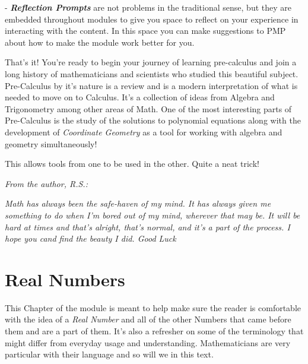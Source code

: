 \documentclass{amsart}
\numberwithin{equation}{section}
\theoremstyle{plain} %
\theoremstyle{definition}
\theoremstyle{remark}
\begin{document}
- \textbf{\textit{Reflection Prompts}} are not problems in the traditional sense, but they are embedded throughout modules to give you space to reflect 
on your experience in interacting with the content. In this space you can make suggestions to PMP about how to make the module work better for you.


\vspace{0.3cm}

That's it! You're ready to begin your journey of learning pre-calculus and join a long history of mathematicians and scientists who studied this beautiful subject. %
Pre-Calculus by it's nature is a review and is a modern interpretation of what is needed to move on to Calculus. It's a collection of ideas from Algebra and Trigonometry among other areas of Math. One of the most
interesting parts of Pre-Calculus is the study of the solutions to polynomial equations along with the development of \emph{Coordinate Geometry} as a tool for working with algebra and geometry simultaneously!

This allows tools from one to be used in the other. Quite a neat trick!%

\newpage


\textit{From the author, R.S.:}%

\textit{\small Math has always been the safe-haven of my mind. It has always given me something to do when I'm bored out of my mind, wherever that may be. It will be hard at times and that's alright, that's normal, and it's a part of the process. I hope you cand find the beauty I did. Good Luck} %




\newpage


\tableofcontents





\newpage

\section{\textbf{Real Numbers}}
This Chapter of the module is meant to help make sure the reader is comfortable with the idea of a \emph{Real Number} and all of the other Numbers that came before them and are a part of them.
It's also a refresher on some of the terminology that might differ from everyday usage and understanding. Mathematicians are very particular with their language and so will we in this text.
\end{document}
